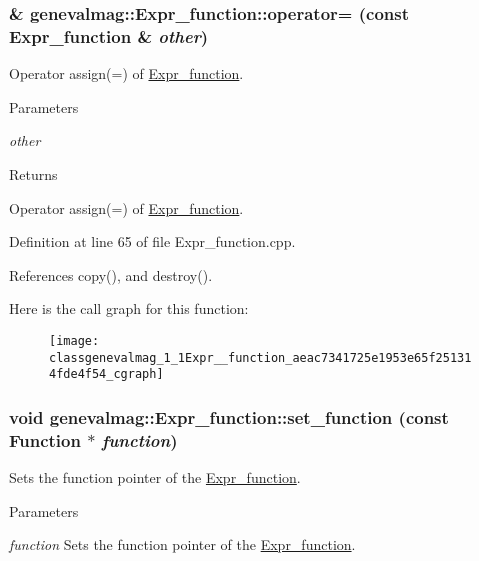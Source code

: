 \hypertarget{classgenevalmag_1_1Expr__function_aeac7341725e1953e65f251314fde4f54}{
\subsubsection[{operator=}]{ \& genevalmag::Expr\_\-function::operator= (const {\bf Expr\_\-function} \& {\em other})}}
\label{classgenevalmag_1_1Expr__function_aeac7341725e1953e65f251314fde4f54}
Operator assign(=) of \hyperlink{classgenevalmag_1_1Expr__function}{Expr\_\-function}. 
\begin{DoxyParams}{Parameters}
\item[{\em other}]\end{DoxyParams}
\begin{DoxyReturn}{Returns}

\end{DoxyReturn}
Operator assign(=) of \hyperlink{classgenevalmag_1_1Expr__function}{Expr\_\-function}. 

Definition at line 65 of file Expr\_\-function.cpp.



References copy(), and destroy().



Here is the call graph for this function:\nopagebreak
\begin{figure}[H]
\begin{center}
\leavevmode
\texttt{[image: classgenevalmag\_1\_1Expr\_\_function\_aeac7341725e1953e65f251314fde4f54\_cgraph]}
\end{center}
\end{figure}


\hypertarget{classgenevalmag_1_1Expr__function_a9d3e5b95868a98b9014d0f1de4ac8ae8}{
\subsubsection[{set\_\-function}]{\setlength{\rightskip}{0pt plus 5cm}void genevalmag::Expr\_\-function::set\_\-function (const {\bf Function} $\ast$ {\em function})}}
\label{classgenevalmag_1_1Expr__function_a9d3e5b95868a98b9014d0f1de4ac8ae8}
Sets the function pointer of the \hyperlink{classgenevalmag_1_1Expr__function}{Expr\_\-function}. 
\begin{DoxyParams}{Parameters}
\item[{\em function}]Sets the function pointer of the \hyperlink{classgenevalmag_1_1Expr__function}{Expr\_\-function}. \end{DoxyParams}


